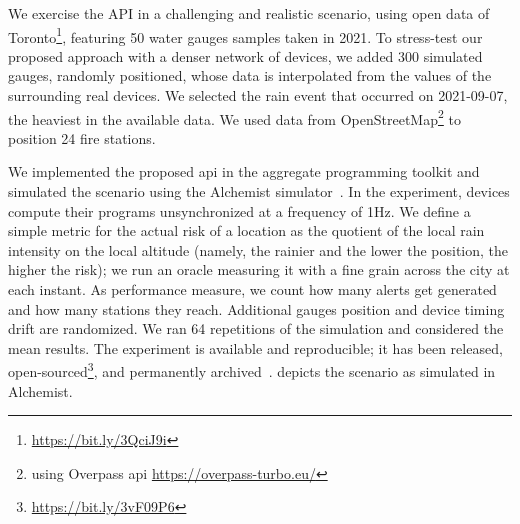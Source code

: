 We exercise the API in a challenging and realistic scenario,
using open data %
 of Toronto\footnote{\url{https://bit.ly/3QciJ9i}},
featuring 50 water gauges samples taken in 2021.
%
To stress-test our proposed approach with a denser network of devices,
we added 300 simulated gauges,
randomly positioned,
whose data is interpolated from the values of the surrounding real devices.
%
We selected the rain event that occurred on 2021-09-07,
the heaviest in the available data.
%
We used data from OpenStreetMap\footnote{using Overpass \ac{api} \url{https://overpass-turbo.eu/}} to position 24 fire stations.

We implemented the proposed \ac{api} in the \scafi{} aggregate programming toolkit
and simulated the scenario using the Alchemist simulator~\cite{Pianini2013}.
%
In the experiment, devices compute their programs unsynchronized at a frequency of 1Hz.
%
We define a simple metric for the actual risk of a location as the quotient of the local rain intensity on the local altitude
(namely, the rainier and the lower the position, the higher the risk);
we run an oracle measuring it with a fine grain across the city at each instant.
%
As performance measure, we count how many alerts get generated and how many stations they reach.
%
Additional gauges position and device timing drift are randomized.
%
We ran 64 repetitions of the simulation and considered the mean results.
%
The experiment is available and reproducible;
it has been released, open-sourced\footnote{\url{https://bit.ly/3vF09P6}},
and permanently archived~\cite{simulation-doi}. %
%
 depicts the scenario as simulated in Alchemist.


